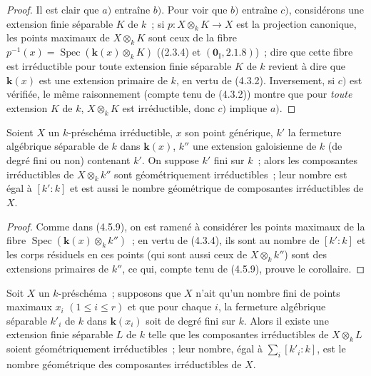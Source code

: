 \begin{proof}
Il est clair que $a)$ entraîne $b)$. Pour voir que $b)$ entraîne $c)$,
considérons une extension finie séparable $K$ de $k$~; si
$p:X\otimes_k K\to X$ est la projection canonique, les
points maximaux de $X\otimes_k K$ sont ceux de la fibre
$p^{-1}(x)=\operatorname{Spec}(\boldsymbol{k}(x)\otimes_k K)$ ((2.3.4) et
$(\mathbf{0}_{\mathrm I},2.1.8)$)~; dire que cette fibre est irréductible pour toute
extension finie séparable $K$ de $k$ revient à dire que $\boldsymbol{k}(x)$ est une
extension primaire de $k$, en vertu de (4.3.2). Inversement, si $c)$ est
vérifiée, le même raisonnement (compte tenu de (4.3.2)) montre que pour \emph{toute}
extension $K$ de $k$, $X\otimes_k K$ est irréductible, donc $c)$ implique
$a)$.
\end{proof}

\begin{corollary}[4.5.10]
\label{IV.2.4.5.10-fr}
Soient $X$ un $k$-préschéma irréductible, $x$ son point générique, $k'$ la
fermeture algébrique séparable de $k$ dans $\boldsymbol{k}(x)$, $k''$ une extension
galoisienne de $k$ (de degré fini ou non) contenant $k'$. On suppose $k'$ fini
sur $k$~; alors les composantes irréductibles de $X\otimes_k k''$ sont
géométriquement irréductibles~; leur nombre est égal à $[k':k]$ et est aussi le
nombre géométrique de composantes irréductibles de $X$.
\end{corollary}

\begin{proof}
Comme dans (4.5.9), on est ramené à considérer les points maximaux de la fibre
$\operatorname{Spec}(\boldsymbol{k}(x)\otimes_k k'')$~; en vertu de (4.3.4), ils sont au
nombre de $[k':k]$ et les corps résiduels en ces points (qui sont aussi ceux de
$X\otimes_k k''$) sont des extensions primaires de $k''$, ce qui, compte tenu
de (4.5.9), prouve le corollaire.
\end{proof}

\begin{corollary}[4.5.11]
Soit $X$ un $k$-préschéma~; supposons que $X$ n'ait qu'un nombre fini de
points maximaux $x_i$ $(1\leqslant i\leqslant r)$ et que pour chaque $i$, la
fermeture algébrique séparable $k'_i$ de $k$ dans $\boldsymbol{k}(x_i)$ soit de degré fini
sur $k$. Alors il existe une extension finie séparable $L$ de $k$ telle que les
composantes irréductibles de $X\otimes_k L$ soient géométriquement
irréductibles~; leur nombre, égal à $\sum_i[k'_i:k]$, est le nombre géométrique
des composantes irréductibles de $X$.
\end{corollary}

